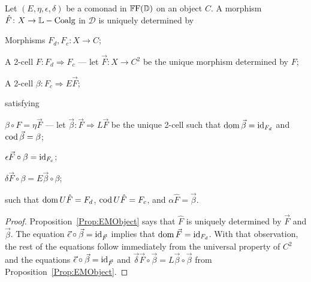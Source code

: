 \begin{lemma}
	Let $(E,\eta,\epsilon,\delta)$ be a comonad in $\mathbb{F}\mathrm{F}(\mathbb{D})$ on an object $C$. A morphism $\hat{F}\colon X\to \mathbb{L}-\mathrm{Coalg}$ in $\mathcal{D}$ is uniquely determined by
	\begin{compactitem}
		\item Morphisms $F_d,F_c\colon X\to C$;
		\item A 2-cell $F\colon F_d\Rightarrow F_c$ --- let $\vec{F}\colon X\to C^2$ be the unique morphism determined by $F$;
		\item A 2-cell $\beta\colon F_c\Rightarrow E\vec{F}$;
	\end{compactitem}
	satisfying
	\begin{compactenum}
		\item $\beta\circ F=\eta\vec{F}$ --- let $\vec{\beta}\colon\vec{F}\Rightarrow L\vec{F}$ be the unique 2-cell such that $\operatorname{dom}\vec{\beta}=\operatorname{id}_{F_d}$ and $\operatorname{cod}\vec{\beta}=\beta$;
		\item $\epsilon\vec{F}\circ\beta = \operatorname{id}_{F_c}$;
		\item $\delta\vec{F}\circ\beta = E\vec{\beta}\circ\beta$;
	\end{compactenum}
	such that $\operatorname{dom} U\hat{F}=F_d$, $\operatorname{cod} U\hat{F}=F_c$, and $\alpha\hat{F}=\vec{\beta}$.
\end{lemma}
\begin{proof}
	Proposition~\ref{Prop:EMObject} says that $\hat{F}$ is uniquely determined by $\vec{F}$ and $\vec{\beta}$. The equation $\vec{\epsilon}\circ\vec{\beta}=\operatorname{id}_{\vec{F}}$ implies that $\operatorname{dom}\vec{F}=\operatorname{id}_{F_d}$. With that observation, the rest of the equations follow immediately from the universal property of $C^2$ and the equations $\vec{\epsilon}\circ\vec{\beta}=\operatorname{id}_{\vec{F}}$ and $\vec{\delta}\vec{F}\circ\vec{\beta} = L\vec{\beta}\circ\vec{\beta}$ from Proposition~\ref{Prop:EMObject}.
\end{proof}